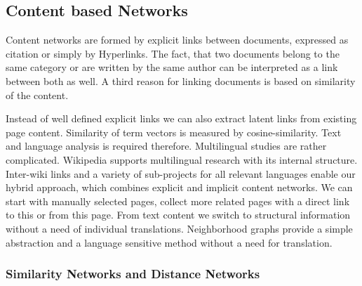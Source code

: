 \documentclass[a4paper,10pt]{scrbook}
\begin{document}
\subsection{Content based Networks}




Content networks are formed by explicit links between documents, expressed as citation or simply by Hyperlinks. The fact, that two documents belong to the same category or are written by the same author can be interpreted as a link between both as well. A third reason for linking documents is based on similarity of the content. 

Instead of well defined explicit links we can also extract latent links from existing page content. Similarity of term vectors is measured by cosine-similarity. Text and language analysis is required therefore. Multilingual studies are rather complicated. Wikipedia supports multilingual research with its internal structure. Inter-wiki links and a variety of sub-projects for all relevant languages enable our hybrid approach, which combines explicit and implicit content networks. We can start with manually selected pages, collect more related pages with a direct link to this or from this page. From text content we switch to structural information without a need of individual translations. Neighborhood graphs provide a simple abstraction and a language sensitive method without a need for translation.

\subsubsection*{Similarity Networks and Distance Networks}
\end{document}
